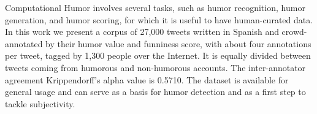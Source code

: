Computational Humor involves several tasks, such as humor recognition, humor generation, and humor scoring, for which it is useful to have human-curated data. In this work we present a corpus of 27,000 tweets written in Spanish and crowd-annotated by their humor value and funniness score, with about four annotations per tweet, tagged by 1,300 people over the Internet. It is equally divided between tweets coming from humorous and non-humorous accounts. The inter-annotator agreement Krippendorff's alpha value is 0.5710. The dataset is available for general usage and can serve as a basis for humor detection and as a first step to tackle subjectivity.
